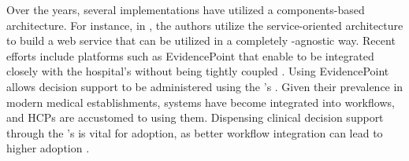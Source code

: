 Over the years, several \CDSS{} implementations have utilized a
components-based architecture. For instance, in \cite{KawamotoJBI10}, the
authors utilize the service-oriented architecture \cite{ErlBook05} to build
a \CDSS{} web service that can be utilized in a completely \EHR{}-agnostic way.
Recent efforts include \CDSSs{} platforms such as
EvidencePoint that enable \CDSS{} to be integrated
closely with the hospital's \EHR{} without being tightly coupled \cite{SolomonJMIR23}.
Using EvidencePoint allows decision support to be administered using the
\EHR{}'s \UI{}. Given their prevalence in modern medical establishments,
\EHR{} systems have become integrated into workflows,
and HCPs are accustomed to using them. Dispensing clinical decision
support through the \EHR{}'s \UI{} is vital for adoption, as better workflow
integration can lead to higher adoption \cite{PressJMIR16,LiJMI16}.


